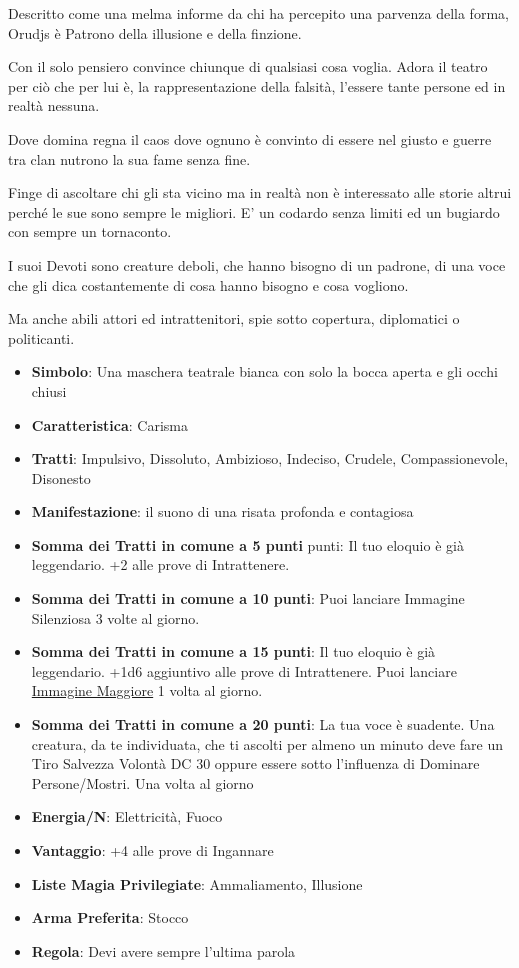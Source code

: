 \begin{multicols}{2}
Descritto come una melma informe da chi ha percepito una parvenza della forma, Orudjs è Patrono della illusione e della finzione.

Con il solo pensiero convince chiunque di qualsiasi cosa voglia. Adora il teatro per ciò che per lui è, la rappresentazione della falsità, l'essere tante persone ed in realtà nessuna.

Dove domina regna il caos dove ognuno è convinto di essere nel giusto e guerre tra clan nutrono la sua fame senza fine.

Finge di ascoltare chi gli sta vicino ma in realtà non è interessato alle storie altrui perché le sue sono sempre le migliori. E' un codardo senza limiti ed un bugiardo con sempre un tornaconto.

I suoi Devoti sono creature deboli, che hanno bisogno di un padrone, di una voce che gli dica costantemente di cosa hanno bisogno e cosa vogliono.

Ma anche abili attori ed intrattenitori, spie sotto copertura, diplomatici o politicanti.

\begin{itemize}[leftmargin=*] \setlength{\itemsep}{0pt}
\item \textbf{Simbolo}: Una maschera teatrale bianca con solo la bocca aperta e gli occhi chiusi
\item \textbf{Caratteristica}: Carisma
\item \textbf{Tratti}: Impulsivo, Dissoluto, Ambizioso, Indeciso, Crudele, Compassionevole, Disonesto
\item \textbf{Manifestazione}: il suono di una risata profonda e contagiosa
\item \textbf{Somma dei Tratti in comune a 5 punti} punti: Il tuo eloquio è già leggendario. +2 alle prove di Intrattenere.
\item \textbf{Somma dei Tratti in comune a 10 punti}: Puoi lanciare Immagine Silenziosa 3 volte al giorno.
\item \textbf{Somma dei Tratti in comune a 15 punti}: Il tuo eloquio è già leggendario. +1d6 aggiuntivo alle prove di Intrattenere. Puoi lanciare \hyperlink{Immagine Maggiore}{Immagine Maggiore} 1 volta al giorno.
\item \textbf{Somma dei Tratti in comune a 20 punti}: La tua voce è suadente. Una creatura, da te individuata, che ti ascolti per almeno un minuto deve fare un Tiro Salvezza Volontà DC 30 oppure essere sotto l'influenza di Dominare Persone/Mostri. Una volta al giorno
\item \textbf{Energia/N}: Elettricità, Fuoco
\item \textbf{Vantaggio}: +4 alle prove di Ingannare
\item \textbf{Liste Magia Privilegiate}: Ammaliamento, Illusione
\item \textbf{Arma Preferita}: Stocco
\item \textbf{Regola}: Devi avere sempre l'ultima parola
\end{itemize}


\end{multicols}
